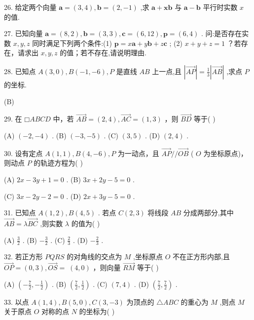 \documentclass[10pt]{article}
\begin{document}
26. 给定两个向量 \(\mathbf{a} = \left( {3,4}\right) ,\mathbf{b} = \left( {2, - 1}\right)\) ,求 \(\mathbf{a} + \mathbf{x}\mathbf{b}\) 与 \(\mathbf{a} - \mathbf{b}\) 平行时实数 \(x\) 的值.

27. 已知向量 \(\mathbf{a} = \left( {8,2}\right) ,\mathbf{b} = \left( {3,3}\right) ,\mathbf{c} = \left( {6,{12}}\right) ,\mathbf{p} = \left( {6,4}\right)\) . 问:是否存在实数 \(x,y,z\) 同时满足下列两个条件:(1) \(\mathbf{p} = x\mathbf{a} + y\mathbf{b} + z\mathbf{c}\) ; (2) \(x + y + z = 1\) ？若存在，请求出 \(x,y,z\) 的值；若不存在,请说明理由.

28. 已知点 \(A\left( {3,0}\right) ,B\left( {-1, - 6}\right) ,P\) 是直线 \({AB}\) 上一点,且 \(\left| \overrightarrow{AP}\right|  = \frac{1}{3}\left| \overrightarrow{AB}\right|\) ,求点 \(P\) 的坐标.

(B)

29. 在 \(□ {ABCD}\) 中，若 \(\overrightarrow{AB} = \left( {2,4}\right) ,\overrightarrow{AC} = \left( {1,3}\right)\) ，则 \(\overrightarrow{BD}\) 等于( )

(A) \(\left( {-2, - 4}\right)\) . (B) \(\left( {-3, - 5}\right)\) . (C) \(\left( {3,5}\right)\) . (D) \(\left( {2,4}\right)\) .

30. 设有定点 \(A\left( {1,1}\right) ,B\left( {4, - 6}\right) ,P\) 为一动点，且 \(\overrightarrow{AP}//\overrightarrow{OB}\) ( \(O\) 为坐标原点)，则动点 \(P\) 的轨迹方程为( )

(A) \({2x} - {3y} + 1 = 0\) . (B) \({3x} + {2y} - 5 = 0\) .

(C) \({3x} - {2y} - 2 = 0\) . (D) \({2x} + {3y} - 5 = 0\) .

31. 已知点 \(A\left( {1,2}\right) ,B\left( {4,5}\right)\) . 若点 \(C\left( {2,3}\right)\) 将线段 \({AB}\) 分成两部分,其中 \(\overrightarrow{AB} = \lambda \overrightarrow{BC}\) ,则实数 \(\lambda\) 的值为( )

(A) \(\frac{3}{2}\) . (B) \(- \frac{3}{2}\) . (C) \(\frac{2}{3}\) . (D) \(- \frac{2}{3}\) .

32. 若正方形 \({PQRS}\) 的对角线的交点为 \(M\) ,坐标原点 \(O\) 不在正方形内部,且 \(\overrightarrow{OP} = \left( {0,3}\right) ,\overrightarrow{OS} = \; \left( {4,0}\right)\) ，则向量 \(\overrightarrow{RM}\) 等于(   )

(A) \(\left( {-\frac{7}{2}, - \frac{1}{2}}\right)\) . (B) \(\left( {\frac{7}{2},\frac{1}{2}}\right)\) . (C) \(\left( {7,4}\right)\) . (D) \(\left( {\frac{7}{2},\frac{7}{2}}\right)\) .

33. 以点 \(A\left( {1,4}\right) ,B\left( {5,0}\right) ,C\left( {3, - 3}\right)\) 为顶点的 \(\bigtriangleup {ABC}\) 的重心为 \(M\) ,则点 \(M\) 关于原点 \(O\) 对称的点 \(N\) 的坐标为( )
\end{document}
